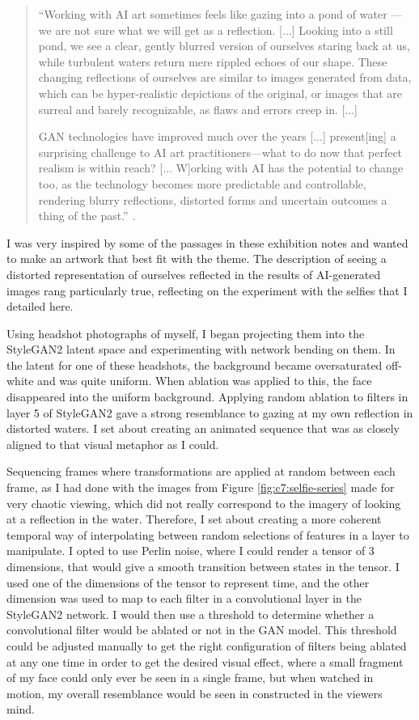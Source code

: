 \begin{quote}
``Working with AI art sometimes feels like gazing into a pond of water — we are not sure what we will get as a reflection. [...] Looking into a still pond, we see a clear, gently blurred version of ourselves staring back at us, while turbulent waters return mere rippled echoes of our shape. These changing reflections of ourselves are similar to images generated from data, which can be hyper-realistic depictions of the original, or images that are surreal and barely recognizable, as flaws and errors creep in. [...]

GAN technologies have improved much over the years [...] present[ing] a surprising challenge to AI art practitioners—what to do now that perfect realism is within reach? [... W]orking with AI has the potential to change too, as the technology becomes more predictable and controllable, rendering blurry reflections, distorted forms and uncertain outcomes a thing of the past.'' \citep{elliot2021reflections}.
\end{quote}

I was very inspired by some of the passages in these exhibition notes and wanted to make an artwork that best fit with the theme. 
The description of seeing a distorted representation of ourselves reflected in the results of AI-generated images rang particularly true, reflecting on the experiment with the selfies that I detailed here.

Using headshot photographs of myself, I began projecting them into the StyleGAN2 latent space and experimenting with network bending on them. 
In the latent for one of these headshots, the background became oversaturated off-white and was quite uniform. 
When ablation was applied to this, the face disappeared into the uniform background. 
Applying random ablation to filters in layer 5 of StyleGAN2 gave a strong resemblance to gazing at my own reflection in distorted waters.
I set about creating an animated sequence that was as closely aligned to that visual metaphor as I could.

Sequencing frames where transformations are applied at random between each frame, as I had done with the images from Figure \ref{fig:c7:selfie-series} made for very chaotic viewing, which did not really correspond to the imagery of looking at a reflection in the water.
Therefore, I set about creating a more coherent temporal way of interpolating between random selections of features in a layer to manipulate. 
I opted to use Perlin noise, where I could render a tensor of 3 dimensions, that would give a smooth transition between states in the tensor.
I used one of the dimensions of the tensor to represent time, and the other dimension was used to map to each filter in a convolutional layer in the StyleGAN2 network.
I would then use a threshold to determine whether a convolutional filter would be ablated or not in the GAN model.
This threshold could be adjusted manually to get the right configuration of filters being ablated at any one time in order to get the desired visual effect, where a small fragment of my face could only ever be seen in a single frame, but when watched in motion, my overall resemblance would be seen in constructed in the viewers mind. 

